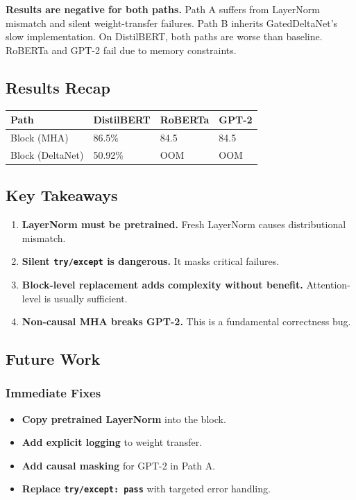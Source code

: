 \textbf{Results are negative for both paths.} Path A suffers from LayerNorm 
mismatch and silent weight-transfer failures. Path B inherits GatedDeltaNet's 
slow implementation. On DistilBERT, both paths are worse than baseline. 
RoBERTa and GPT-2 fail due to memory constraints.

\subsection{Results Recap}

\begin{table}[H]
\centering
\small
\begin{tabular}{llll}
\toprule
\textbf{Path} & \textbf{DistilBERT} & \textbf{RoBERTa} & \textbf{GPT-2} \\
\midrule
Block (MHA) & 86.5\% & 84.5 & 84.5 \\
Block (DeltaNet) & 50.92\% & OOM & OOM \\
\bottomrule
\end{tabular}
\end{table}

\subsection{Key Takeaways}

\begin{enumerate}
\item \textbf{LayerNorm must be pretrained.} Fresh LayerNorm causes distributional
  mismatch.
\item \textbf{Silent \texttt{try/except} is dangerous.} It masks critical failures.
\item \textbf{Block-level replacement adds complexity without benefit.} Attention-level
  is usually sufficient.
\item \textbf{Non-causal MHA breaks GPT-2.} This is a fundamental correctness bug.

\end{enumerate}
\subsection{Future Work}

\subsubsection{Immediate Fixes}

\begin{itemize}
\item \textbf{Copy pretrained LayerNorm} into the block.
\item \textbf{Add explicit logging} to weight transfer.
\item \textbf{Add causal masking} for GPT-2 in Path A.
\item \textbf{Replace \texttt{try/except: pass}} with targeted error handling.

\end{itemize}
